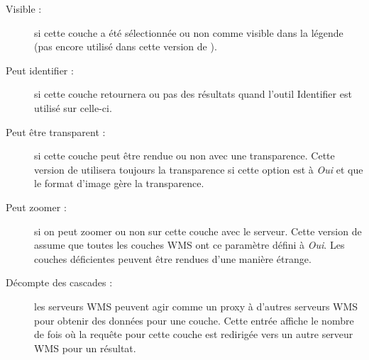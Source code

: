 \begin{itemize}[label=--]
\begin{description}
\item[Visible :]  si cette couche a été sélectionnée ou non
comme visible dans la légende (pas encore utilisé dans cette version de \qg).

\item[Peut identifier :]  si cette couche retournera ou pas des
résultats quand l'outil Identifier est utilisé sur celle-ci.

\item[Peut être transparent :]  si cette couche peut être rendue ou
non avec une transparence. Cette version de \qg utilisera toujours la
transparence si cette option est à \textsl{Oui} et que le format d'image gère
la transparence.
\item[Peut zoomer :]  si on peut zoomer ou non sur cette couche
avec le serveur. Cette version de \qg assume que toutes les couches WMS ont ce
paramètre défini à \textsl{Oui}. Les couches déficientes peuvent être rendues
d'une manière étrange.

\item[Décompte des cascades :]  les serveurs WMS peuvent agir comme
un proxy à d'autres serveurs WMS pour obtenir des données pour une couche.
Cette entrée affiche le nombre de fois où la requête pour cette couche est
redirigée vers un autre serveur WMS pour un résultat.


\end{description}
\end{itemize}
